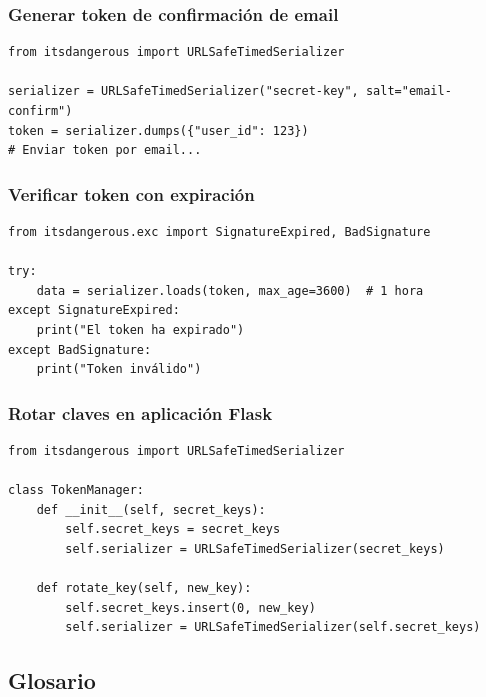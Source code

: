 \documentclass[11pt,a4paper]{article}
\begin{document}
\subsubsection*{Generar token de confirmación de email}


\begin{lstlisting}
from itsdangerous import URLSafeTimedSerializer

serializer = URLSafeTimedSerializer("secret-key", salt="email-confirm")
token = serializer.dumps({"user_id": 123})
# Enviar token por email...
\end{lstlisting}


\subsubsection*{Verificar token con expiración}


\begin{lstlisting}
from itsdangerous.exc import SignatureExpired, BadSignature

try:
    data = serializer.loads(token, max_age=3600)  # 1 hora
except SignatureExpired:
    print("El token ha expirado")
except BadSignature:
    print("Token inválido")
\end{lstlisting}


\subsubsection*{Rotar claves en aplicación Flask}


\begin{lstlisting}
from itsdangerous import URLSafeTimedSerializer

class TokenManager:
    def __init__(self, secret_keys):
        self.secret_keys = secret_keys
        self.serializer = URLSafeTimedSerializer(secret_keys)
    
    def rotate_key(self, new_key):
        self.secret_keys.insert(0, new_key)
        self.serializer = URLSafeTimedSerializer(self.secret_keys)
\end{lstlisting}


\subsection*{Glosario}
\end{document}
